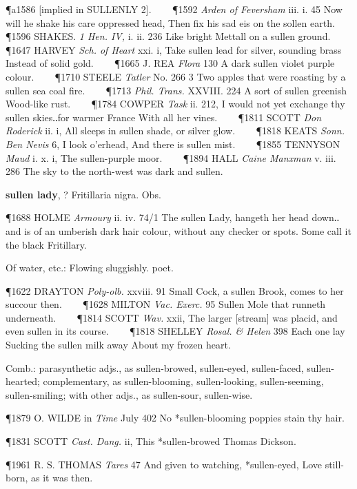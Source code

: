 \begin{description}[wide, labelwidth=!, labelindent=0pt]
\begin{myenumerate}
\P a1586 [implied in  SULLENLY 2].    
\P 1592 \textit{Arden  of Feversham} iii. i. 45 Now will he shake his care oppressed head, Then fix his sad eis on the sollen earth.    
\P 1596 SHAKES.  \textit{1 Hen. IV,} i. ii. 236 Like bright Mettall on a sullen ground.    
\P 1647 HARVEY  \textit{Sch. of Heart} xxi. i, Take sullen lead for silver, sounding brass Instead of solid gold.    
\P 1665 J. REA  \textit{Flora} 130 A dark sullen violet purple colour.    
\P 1710 STEELE  \textit{Tatler} No. 266 3 Two apples that were roasting by a sullen sea coal fire.    
\P 1713  \textit{Phil. Trans.} XXVIII. 224 A sort of sullen greenish Wood-like rust.    
\P 1784 COWPER  \textit{Task} ii. 212, I would not yet exchange thy sullen skies‥for warmer France With all her vines.    
\P 1811 SCOTT  \textit{Don Roderick} ii. i, All sleeps in sullen shade, or silver glow.    
\P 1818 KEATS  \textit{Sonn. Ben Nevis} 6, I look o'erhead, And there is sullen mist.    
\P 1855 TENNYSON  \textit{Maud} i. x. i, The sullen-purple moor.    
\P 1894 HALL  \textit{Caine Manxman} v. iii. 286 The sky to the north-west was dark and sullen.

 \textbf{sullen lady}, ? Fritillaria nigra. Obs.

\P 1688 HOLME  \textit{Armoury} ii. iv. 74/1 The sullen Lady, hangeth her head down‥and is of an umberish dark hair colour, without any checker or spots. Some call it the black Fritillary.

 Of water, etc.: Flowing sluggishly. poet.

\P 1622 DRAYTON  \textit{Poly-olb.} xxviii. 91 Small Cock, a sullen Brook, comes to her succour then.    
\P 1628 MILTON  \textit{Vac. Exerc.} 95 Sullen Mole that runneth underneath.    
\P 1814 SCOTT  \textit{Wav.} xxii, The larger [stream] was placid, and even sullen in its course.    
\P 1818 SHELLEY  \textit{Rosal. \& Helen} 398 Each one lay Sucking the sullen milk away About my frozen heart.

 Comb.: parasynthetic adjs., as sullen-browed, sullen-eyed, sullen-faced, sullen-hearted; complementary, as sullen-blooming, sullen-looking, sullen-seeming, sullen-smiling; with other adjs., as sullen-sour, sullen-wise.

\P 1879 O. WILDE in  \textit{Time} July 402 No *sullen-blooming poppies stain thy hair.

\P 1831 SCOTT  \textit{Cast. Dang.} ii, This *sullen-browed Thomas Dickson.

\P 1961 R. S. THOMAS  \textit{Tares} 47 And given to watching, *sullen-eyed, Love still-born, as it was then.


\end{myenumerate}
\end{description}
